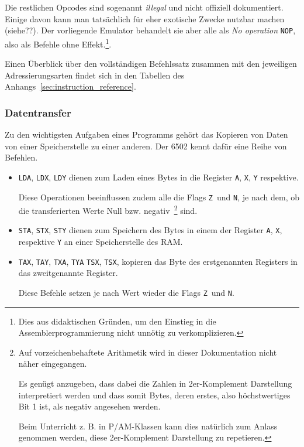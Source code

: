 \documentclass[11pt]{scrartcl}
\newcommand{\nflag}{\texttt{N}}
\newcommand{\zflag}{\texttt{Z}}
\begin{document}
Die restlichen Opcodes sind sogenannt \emph{illegal} und nicht
offiziell dokumentiert. Einige davon kann man tatsächlich für eher
exotische Zwecke nutzbar machen (siehe??). Der vorliegende Emulator
behandelt sie aber alle als \emph{No operation} \texttt{NOP}, also als
Befehle ohne Effekt.\footnote{Dies aus didaktischen Gründen, um den
  Einstieg in die Assemblerprogrammierung nicht unnötig zu
  verkomplizieren.}.

Einen Überblick über den vollständigen Befehlssatz zusammen mit den jeweiligen Adressierungsarten findet sich in den Tabellen des Anhangs~\ref{sec:instruction_reference}.

\subsubsection{Datentransfer}
\label{sec:datatransfer_instructions}
Zu den wichtigsten Aufgaben eines Programms gehört das Kopieren von
Daten von einer Speicherstelle zu einer anderen. Der 6502 kennt dafür
eine Reihe von Befehlen.

\begin{itemize}
\item \texttt{LDA}, \texttt{LDX}, \texttt{LDY} dienen zum Laden eines
  Bytes in die Register \texttt{A}, \texttt{X}, \texttt{Y} respektive.

  Diese Operationen beeinflussen zudem alle die Flags \zflag\ und \nflag,
  je nach dem, ob die transferierten Werte Null
  bzw. negativ~\footnote{Auf vorzeichenbehaftete Arithmetik wird in
    dieser Dokumentation nicht näher eingegangen.
    
    Es genügt anzugeben, dass dabei die Zahlen in 2er-Komplement
    Darstellung interpretiert werden und dass somit Bytes, deren erstes,
    also höchstwertiges Bit 1 ist, als negativ angesehen werden.
    
    Beim Unterricht z. B. in P/AM-Klassen kann dies natürlich zum Anlass
    genommen werden, diese 2er-Komplement Darstellung zu repetieren.}
  sind.
\item \texttt{STA}, \texttt{STX}, \texttt{STY} dienen zum Speichern
  des Bytes in einem der  Register \texttt{A}, \texttt{X}, respektive
  \texttt{Y} an einer Speicherstelle des RAM.
\item \texttt{TAX}, \texttt{TAY}, \texttt{TXA}, \texttt{TYA}
  \texttt{TSX}, \texttt{TSX}, kopieren das Byte des erstgenannten
  Registers in das zweitgenannte Register.

  Diese Befehle setzen je nach Wert wieder die Flags \zflag\ und \nflag. 
\end{itemize}
\end{document}
